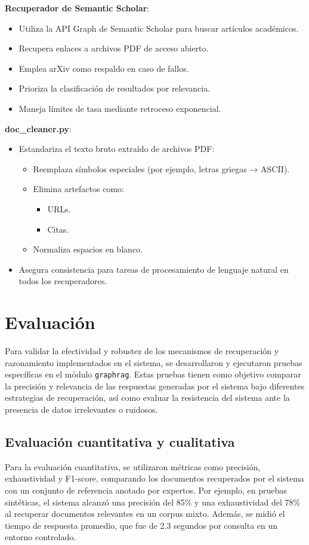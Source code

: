 \documentclass[12pt]{article}
\begin{document}
    
\textbf{Recuperador de Semantic Scholar}:
\begin{itemize}
    \item Utiliza la API Graph de Semantic Scholar para buscar artículos académicos.
    \item Recupera enlaces a archivos PDF de acceso abierto.
    \item Emplea arXiv como respaldo en caso de fallos.
    \item Prioriza la clasificación de resultados por relevancia.
    \item Maneja límites de tasa mediante retroceso exponencial.
\end{itemize}

    
\textbf{doc\_cleaner.py}:
\begin{itemize}
    \item Estandariza el texto bruto extraído de archivos PDF:
        \begin{itemize}
            \item Reemplaza símbolos especiales (por ejemplo, letras griegas → ASCII).
            \item Elimina artefactos como:
                \begin{itemize}
                    \item URLs.
                    \item Citas.
                \end{itemize}
            \item Normaliza espacios en blanco.
        \end{itemize}
    \item Asegura consistencia para tareas de procesamiento de lenguaje natural en todos los recuperadores.
\end{itemize}

\section{Evaluación}

Para validar la efectividad y robustez de los mecanismos de recuperación y razonamiento implementados en el sistema, se desarrollaron y ejecutaron pruebas específicas en el módulo \texttt{graphrag}. Estas pruebas tienen como objetivo comparar la precisión y relevancia de las respuestas generadas por el sistema bajo diferentes estrategias de recuperación, así como evaluar la resistencia del sistema ante la presencia de datos irrelevantes o ruidosos.

\subsection{Evaluación cuantitativa y cualitativa}
Para la evaluación cuantitativa, se utilizaron métricas como precisión, exhaustividad y F1-score, comparando los documentos recuperados por el sistema con un conjunto de referencia anotado por expertos. Por ejemplo, en pruebas sintéticas, el sistema alcanzó una precisión del 85\% y una exhaustividad del 78\% al recuperar documentos relevantes en un corpus mixto. Además, se midió el tiempo de respuesta promedio, que fue de 2.3 segundos por consulta en un entorno controlado.
\end{document}
